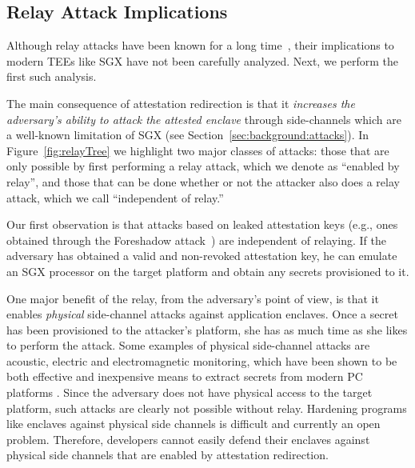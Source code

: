             
\subsection{Relay Attack Implications}
\label{sec:problemStatement:implication}

Although relay attacks have been known for a long time~\cite{parno2008bootstrapping}, their implications to modern TEEs like SGX have not been carefully analyzed. Next, we perform the first such analysis.

The main consequence of attestation redirection is that it \emph{increases the adversary's ability to attack the attested enclave} through side-channels which are a well-known limitation of SGX (see Section~\ref{sec:background:attacks}). In Figure~\ref{fig:relayTree} we highlight two major classes of attacks: those that are only possible by first performing a relay attack, which we denote as ``enabled by relay'', and those that can be done whether or not the attacker also does a relay attack, which we call ``independent of relay.''

Our first observation is that attacks based on leaked attestation keys (e.g., ones obtained through the Foreshadow attack~\cite{foreshadow-usenix18}) are independent of relaying. If the adversary has obtained a valid and non-revoked attestation key, he can emulate an SGX processor on the target platform and obtain any secrets provisioned to it. %

One major benefit of the relay, from the adversary's point of view, is that it enables \emph{physical} side-channel attacks against application enclaves. Once a secret has been provisioned to the attacker's platform, she has as much time as she likes to perform the attack. Some examples of physical side-channel attacks are acoustic, electric and electromagnetic monitoring, which have been shown to be both effective and inexpensive means to extract secrets from modern PC platforms . Since the adversary does not have physical access to the target platform, such attacks are clearly not possible without relay. Hardening programs like enclaves against physical side channels is difficult and currently an open problem. Therefore, developers cannot easily defend their enclaves against physical side channels that are enabled by attestation redirection.


